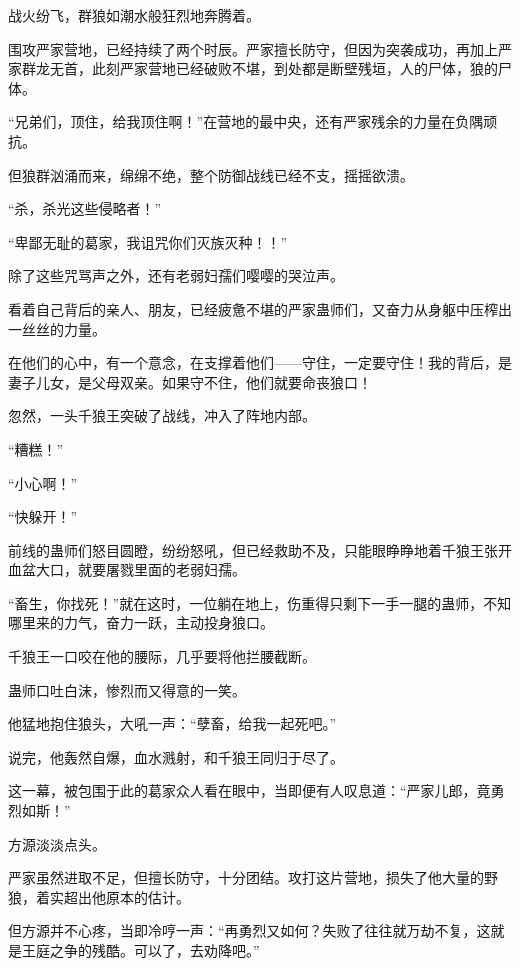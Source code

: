 
\begin{this_body}

战火纷飞，群狼如潮水般狂烈地奔腾着。

围攻严家营地，已经持续了两个时辰。严家擅长防守，但因为突袭成功，再加上严家群龙无首，此刻严家营地已经破败不堪，到处都是断壁残垣，人的尸体，狼的尸体。

“兄弟们，顶住，给我顶住啊！”在营地的最中央，还有严家残余的力量在负隅顽抗。

但狼群汹涌而来，绵绵不绝，整个防御战线已经不支，摇摇欲溃。

“杀，杀光这些侵略者！”

“卑鄙无耻的葛家，我诅咒你们灭族灭种！！”

除了这些咒骂声之外，还有老弱妇孺们嘤嘤的哭泣声。

看着自己背后的亲人、朋友，已经疲惫不堪的严家蛊师们，又奋力从身躯中压榨出一丝丝的力量。

在他们的心中，有一个意念，在支撑着他们——守住，一定要守住！我的背后，是妻子儿女，是父母双亲。如果守不住，他们就要命丧狼口！

忽然，一头千狼王突破了战线，冲入了阵地内部。

“糟糕！”

“小心啊！”

“快躲开！”

前线的蛊师们怒目圆瞪，纷纷怒吼，但已经救助不及，只能眼睁睁地着千狼王张开血盆大口，就要屠戮里面的老弱妇孺。

“畜生，你找死！”就在这时，一位躺在地上，伤重得只剩下一手一腿的蛊师，不知哪里来的力气，奋力一跃，主动投身狼口。

千狼王一口咬在他的腰际，几乎要将他拦腰截断。

蛊师口吐白沫，惨烈而又得意的一笑。

他猛地抱住狼头，大吼一声：“孽畜，给我一起死吧。”

说完，他轰然自爆，血水溅射，和千狼王同归于尽了。

这一幕，被包围于此的葛家众人看在眼中，当即便有人叹息道：“严家儿郎，竟勇烈如斯！”

方源淡淡点头。

严家虽然进取不足，但擅长防守，十分团结。攻打这片营地，损失了他大量的野狼，着实超出他原本的估计。

但方源并不心疼，当即冷哼一声：“再勇烈又如何？失败了往往就万劫不复，这就是王庭之争的残酷。可以了，去劝降吧。”


\end{this_body}
